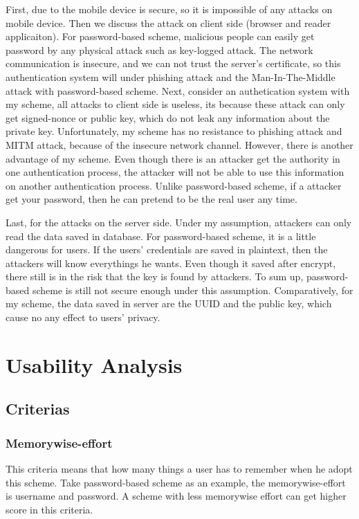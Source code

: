 \begin{CJK}{Bg5}{bsmi}
First, due to the mobile device is secure, so it is impossible of any attacks on mobile device. Then we discuss the attack on client side (browser and reader applicaiton). For password-based scheme, malicious people can easily get password by any physical attack such as key-logged attack. The network communication is insecure, and we can not trust the server's certificate, so this authentication system will under phishing attack and the Man-In-The-Middle attack with password-based scheme. Next, consider an authetication system with my scheme, all attacks to client side is useless, its because these attack can only get signed-nonce or public key, which do not leak any information about the private key. Unfortunately, my scheme has no resistance to phishing attack and MITM attack, because of the insecure network channel. However, there is another advantage of my scheme. Even though there is an attacker get the authority in one authentication process, the attacker will not be able to use this information on another authentication process. Unlike password-based scheme, if a attacker get your password, then he can pretend to be the real user any time.

Last, for the attacks on the server side. Under my assumption, attackers can only read the data saved in database. For password-based scheme, it is a little dangerous for users. If the users' credentials are saved in plaintext, then the attackers will know everythings he wants. Even though it saved after encrypt, there still is in the risk that the key is found by attackers. To sum up, password-based scheme is still not secure enough under this assumption. Comparatively, for my scheme, the data saved in server are the UUID and the public key, which cause no any effect to users' privacy.

\section{Usability Analysis}

\subsection{Criterias}

\subsubsection{Memorywise-effort}

This criteria means that how many things a user has to remember when he adopt this scheme. Take password-based scheme as an example, the memorywise-effort is username and password. A scheme with less memorywise effort can get higher score in this criteria.


\end{CJK}
